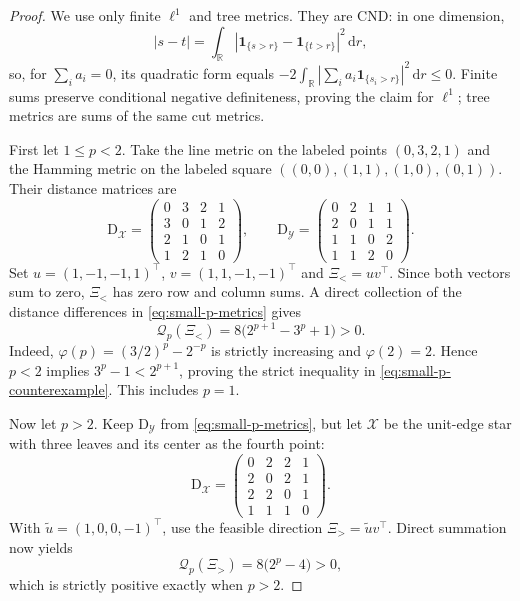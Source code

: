 \documentclass[11pt,a4paper]{article}
\theoremstyle{definition}
\theoremstyle{remark}
\newcommand{\R}{\mathbb R}
\newcommand{\Qcal}{\mathcal Q}
\newcommand{\dd}{\,\mathrm d}
\newcommand{\abs}[1]{\left\lvert #1\right\rvert}
\begin{document}
\begin{proof}
We use only finite \(\ell^1\) and tree metrics.  They are CND: in one
dimension,
\[
  \abs{s-t}
  =\int_{\R}
  \abs{\mathbf 1_{\{s>r\}}-\mathbf 1_{\{t>r\}}}^2\dd r,
\]
so, for \(\sum_i a_i=0\), its quadratic form equals
\(-2\int_{\R}\abs{\sum_i a_i\mathbf 1_{\{s_i>r\}}}^2\dd r\leq0\).
Finite sums preserve conditional negative definiteness, proving the claim for
\(\ell^1\); tree metrics are sums of the same cut metrics.

First let \(1\leq p<2\).  Take the line metric on the labeled points
\((0,3,2,1)\) and the Hamming metric on the labeled square
\(((0,0),(1,1),(1,0),(0,1))\).  Their distance matrices are
\begin{equation}
  \mathrm D_{\mathcal X}
  =\begin{pmatrix}
    0&3&2&1\\3&0&1&2\\2&1&0&1\\1&2&1&0
  \end{pmatrix},
  \qquad
  \mathrm D_{\mathcal Y}
  =\begin{pmatrix}
    0&2&1&1\\2&0&1&1\\1&1&0&2\\1&1&2&0
  \end{pmatrix}.
  \label{eq:small-p-metrics}
\end{equation}
Set \(u=(1,-1,-1,1)^\top\), \(v=(1,1,-1,-1)^\top\) and
\(\Xi_{<}=uv^\top\).  Since both vectors sum to zero, \(\Xi_{<}\) has zero
row and column sums.  A direct collection of the distance differences in
\eqref{eq:small-p-metrics} gives
\begin{equation}
  \Qcal_p(\Xi_{<})
  =8\bigl(2^{p+1}-3^p+1\bigr)>0.
  \label{eq:small-p-counterexample}
\end{equation}
Indeed, \(\varphi(p)=(3/2)^p-2^{-p}\) is strictly increasing and
\(\varphi(2)=2\).  Hence \(p<2\) implies
\(3^p-1<2^{p+1}\), proving the strict inequality in
\eqref{eq:small-p-counterexample}.  This includes \(p=1\).

Now let \(p>2\).  Keep \(\mathrm D_{\mathcal Y}\) from
\eqref{eq:small-p-metrics}, but let \(\mathcal X\) be the unit-edge star with
three leaves and its center as the fourth point:
\begin{equation}
  \mathrm D_{\mathcal X}
  =\begin{pmatrix}
    0&2&2&1\\2&0&2&1\\2&2&0&1\\1&1&1&0
  \end{pmatrix}.
  \label{eq:large-p-metric}
\end{equation}
With \(\widetilde u=(1,0,0,-1)^\top\), use the feasible direction
\(\Xi_{>}=\widetilde u v^\top\).  Direct summation now yields
\begin{equation}
  \Qcal_p(\Xi_{>})=8\bigl(2^p-4\bigr)>0,
  \label{eq:large-p-counterexample}
\end{equation}
which is strictly positive exactly when \(p>2\).
\end{proof}
\end{document}
